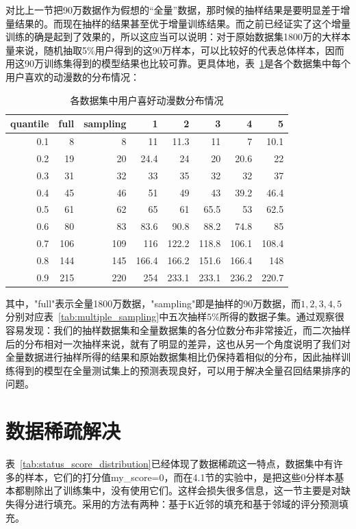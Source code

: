 对比上一节把90万数据作为假想的“全量”数据，那时候的抽样结果是要明显差于增量结果的。而现在抽样的结果甚至优于增量训练结果。而之前已经证实了这个增量训练的确是起到了效果的，所以这应当可以说明：对于原始数据集1800万的大样本量来说，随机抽取5\%用户得到的这90万样本，可以比较好的代表总体样本，因而用这90万训练集得到的模型结果也比较可靠。更具体地，表~\ref{tab:liked_anime_quantile}是各个数据集中每个用户喜欢的动漫数的分布情况：
\begin{table}[htbp]
	\centering
	\caption{各数据集中用户喜好动漫数分布情况}
	\begin{tabular}{rrrrrrrr}
		\toprule
		\multicolumn{1}{l}{quantile} & \multicolumn{1}{l}{full} & \multicolumn{1}{l}{sampling} & 1    & 2    & 3    & 4    & 5 \\
		\midrule
		0.1  & 8    & 8    & 11   & 11.3 & 11   & 7    & 10.1 \\
		0.2  & 19   & 20   & 24.4 & 24   & 20   & 20.6 & 22 \\
		0.3  & 31   & 32   & 33   & 35   & 32   & 32   & 37 \\
		0.4  & 45   & 46   & 51   & 49   & 43   & 39.2 & 46.4 \\
		0.5  & 61   & 62   & 65   & 61   & 65.5 & 53   & 62.5 \\
		0.6  & 80   & 83   & 83.6 & 90.8 & 88.2 & 74.8 & 85 \\
		0.7  & 106  & 109  & 116  & 122.2 & 118.8 & 106.1 & 108.4 \\
		0.8  & 144  & 145  & 166.4 & 166.2 & 151.6 & 166.4 & 148 \\
		0.9  & 215  & 220  & 254  & 233.1 & 233.1 & 236.2 & 220.7 \\
		\bottomrule
	\end{tabular}%
	\label{tab:liked_anime_quantile}%
\end{table}%

其中，"full"表示全量1800万数据，"sampling"即是抽样的90万数据，而$1,2,3,4,5$分别对应表~\ref{tab:multiple_sampling}中五次抽样$5\%$所得的数据子集。通过观察很容易发现：我们的抽样数据集和全量数据集的各分位数分布非常接近，而二次抽样后的分布相对一次抽样来说，就有了明显的差异，这也从另一个角度说明了我们对全量数据进行抽样所得的结果和原始数据集相比仍保持着相似的分布，因此抽样训练得到的模型在全量测试集上的预测表现良好，可以用于解决全量召回结果排序的问题。

\section{数据稀疏解决}
表~\ref{tab:status_score_distribution}已经体现了数据稀疏这一特点，数据集中有许多的样本，它们的打分值my\_score=0，而在4.1节的实验中，是把这些$0$分样本基本都剔除出了训练集中，没有使用它们。这样会损失很多信息，这一节主要是对缺失得分进行填充。采用的方法有两种：基于K近邻的填充和基于邻域的评分预测填充。
